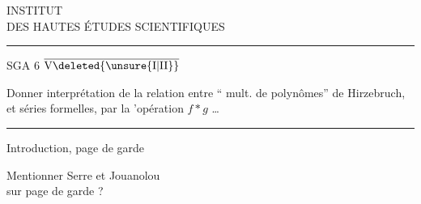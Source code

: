 \noindent\begin{minipage}{.60\linewidth}
\centering
INSTITUT\\
DES HAUTES ÉTUDES SCIENTIFIQUES\\[-.4ex]
\rule{1.4cm}{.4pt}
\end{minipage}

\bigskip
\noindent\begin{minipage}[t]{.31\linewidth}
\raggedleft
SGA 6 \uline{$\overline{\mathrm{V}\deleted{\unsure{\mathrm{I}|\mathrm{II}}}}$}
\end{minipage}\hfill
\begin{minipage}[t]{.64\linewidth}
Donner interprétation de
la relation entre ``
mult. de polynômes'' de
Hirzebruch, et séries formelles,
par la 'opération $f*g$ \ldots
\end{minipage}

\medskip
\noindent\rule{\linewidth}{.4pt}

\medskip
\noindent\hspace*{.08\linewidth}Introduction, page de garde

\medskip
\noindent\hspace*{.18\linewidth}Mentionner Serre et Jouanolou\\[1ex]
\hspace*{.28\linewidth}sur page de garde ?
